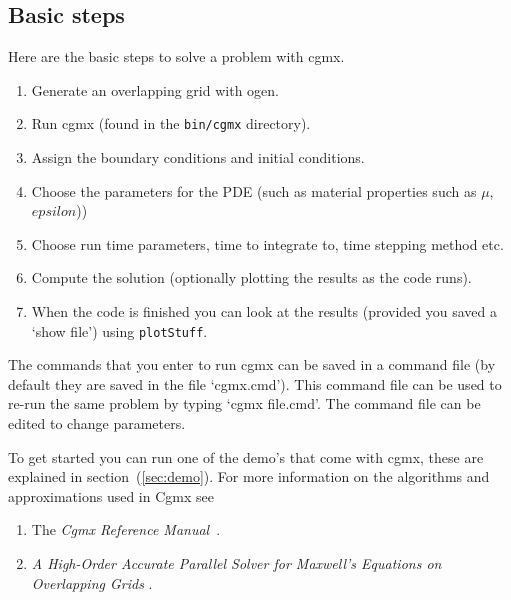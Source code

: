 \documentclass{article}
\newcommand{\Index}[1]{#1\index{#1}}
\newcommand{\obFigures}{\homeHenshaw/res/OverBlown/docFigures}  %
\begin{document}
\subsection{Basic steps}
Here are the basic steps to solve a problem with cgmx.
\begin{enumerate}
  \item Generate an overlapping grid with ogen. 
  \item Run cgmx (found in the {\tt bin/cgmx} directory).
  \item Assign the boundary conditions and initial conditions.
  \item Choose the parameters for the PDE (such as material properties such as $\mu$, $epsilon$))
  \item Choose run time parameters, time to integrate to, time stepping method etc.
  \item Compute the solution (optionally plotting the results as the code runs).
  \item When the code is finished you can look at the results (provided you saved a
     `show file') using {\tt plotStuff}.
\end{enumerate}
The commands that you enter to run cgmx can be saved in a \Index{command file} (by default
they are saved in the file `cgmx.cmd'). This command file can be used to re-run
the same problem by typing `cgmx file.cmd'. The command file can be edited to change parameters.

To get started you can run one of the demo's that come with cgmx, these are 
explained in section~(\ref{sec:demo}).
% 
For more information on the algorithms and approximations used in Cgmx see
\begin{enumerate}
  \item The {\sl Cgmx Reference Manual}~\cite{CgmxReferenceManual}.
  \item {\sl A High-Order Accurate Parallel Solver for {Maxwell}'s Equations on Overlapping Grids}
        \cite{max2006b}.
\end{enumerate}

  
\end{document}
